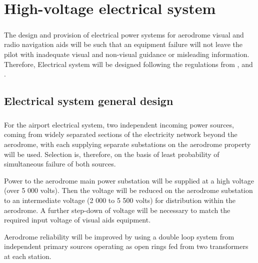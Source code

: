\chapter{High-voltage electrical system}
\paragraph{} The design and provision of electrical power systems for aerodrome visual and radio navigation aids will be such that an equipment failure will not leave the pilot with inadequate visual and non-visual guidance or misleading information. Therefore, Electrical system will be designed following the regulations from \cite{ICAO2006}, \cite{Sanidad2009} and \cite{Standards2016}.

	\section{Electrical system general design}
	\paragraph{} For the airport electrical system, two independent incoming power sources, coming from widely separated sections of the electricity network beyond the aerodrome, with each supplying separate substations on the aerodrome property will be used. Selection is, therefore, on the basis of least probability of simultaneous failure of both sources. 
	
	Power to the aerodrome main power substation will be supplied at a high voltage (over 5 000 volts). Then the voltage will be reduced on the aerodrome substation to an intermediate voltage (2 000 to 5 500 volts) for distribution within the aerodrome. A further step-down of voltage will be necessary to match the required input voltage of visual aids equipment.
	
	Aerodrome reliability will be improved by using a double loop system from independent primary sources operating as open rings fed from two transformers at each station.
	
